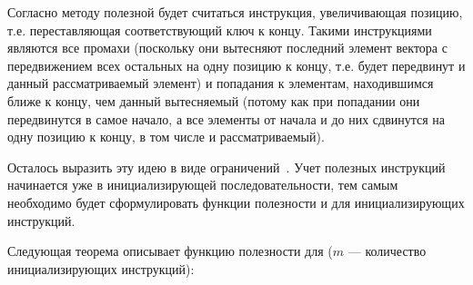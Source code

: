 Согласно методу полезной будет считаться инструкция, увеличивающая позицию, т.е.
переставляющая соответствующий ключ к концу. Такими инструкциями являются все
промахи (поскольку они
вытесняют последний элемент вектора с передвижением всех остальных на одну
позицию к концу, т.е. будет передвинут и данный рассматриваемый элемент) и
попадания к элементам, находившимся ближе к концу, чем данный вытесняемый
(потому как при попадании они
передвинутся в самое начало, а все элементы от начала и до них сдвинутся на одну
позицию к концу, в том числе и рассматриваемый).

Осталось выразить эту идею в виде ограничений~\cite{my_ewdts_2009}.
Учет полезных инструкций начинается уже в инициализирующей последовательности,
тем самым необходимо будет сформулировать функции полезности и для
инициализирующих инструкций.

Следующая теорема описывает функцию полезности для \LRU ($m$ --- количество
инициализирующих инструкций):

